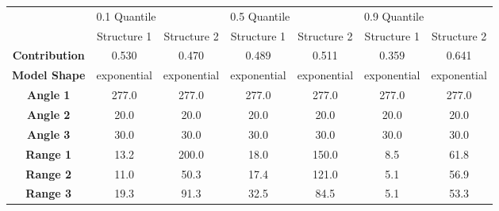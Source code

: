 \begin{tabular}{ccccccc}
\toprule
{} & \multicolumn{2}{l}{0.1 Quantile} & \multicolumn{2}{l}{0.5 Quantile} & \multicolumn{2}{l}{0.9 Quantile} \\
{} &  Structure 1 &  Structure 2 &  Structure 1 &  Structure 2 &  Structure 1 &  Structure 2 \\
\midrule
\textbf{Contribution} &        0.530 &        0.470 &        0.489 &        0.511 &        0.359 &        0.641 \\
\textbf{Model Shape } &  exponential &  exponential &  exponential &  exponential &  exponential &  exponential \\
\textbf{Angle 1     } &        277.0 &        277.0 &        277.0 &        277.0 &        277.0 &        277.0 \\
\textbf{Angle 2     } &         20.0 &         20.0 &         20.0 &         20.0 &         20.0 &         20.0 \\
\textbf{Angle 3     } &         30.0 &         30.0 &         30.0 &         30.0 &         30.0 &         30.0 \\
\textbf{Range 1     } &         13.2 &        200.0 &         18.0 &        150.0 &          8.5 &         61.8 \\
\textbf{Range 2     } &         11.0 &         50.3 &         17.4 &        121.0 &          5.1 &         56.9 \\
\textbf{Range 3     } &         19.3 &         91.3 &         32.5 &         84.5 &          5.1 &         53.3 \\
\bottomrule
\end{tabular}

